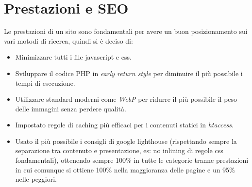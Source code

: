 \section{Prestazioni e SEO}

Le prestazioni di un sito sono fondamentali per avere un buon posizionamento
sui vari motodi di ricerca, quindi si è deciso di:
\begin{itemize}
    \item Minimizzare tutti i file javascript e css.
    \item Sviluppare il codice PHP in \textit{early return style} per diminuire
        il più possibile i tempi di esecuzione.
    \item Utilizzare standard moderni come \textit{WebP} per ridurre il più
        possibile il peso delle immagini senza perdere qualità.
    \item Impostato regole di caching più efficaci per i contenuti statici in
        \textit{htaccess}.
    \item Usato il più possibile i consigli di google lighthouse (rispettando
        sempre la separazione tra contenuto e presentazione, es: no inlining
        di regole css fondamentali), ottenendo sempre 100\% in tutte le categorie
        tranne prestazioni in cui comunque si ottiene 100\% nella maggioranza delle
        pagine e un 95\% nelle peggiori.
\end{itemize}
